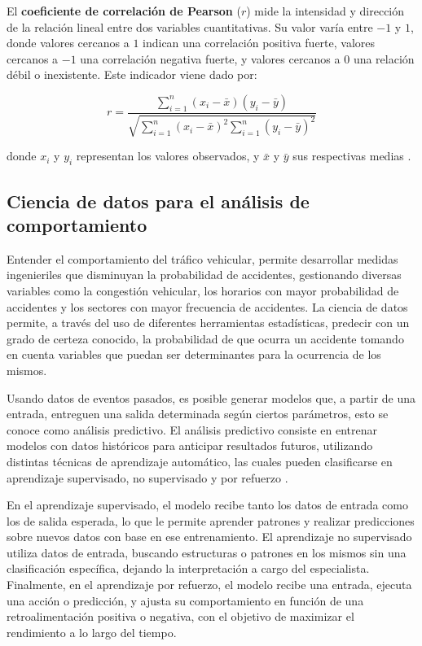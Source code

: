 \documentclass[12pt]{article}
\begin{document}
El \textbf{coeficiente de correlación de Pearson} (\( r \)) mide la intensidad y dirección de la relación lineal entre dos variables cuantitativas. Su valor varía entre $-1$ y $1$, donde valores cercanos a $1$ indican una correlación positiva fuerte, valores cercanos a $-1$ una correlación negativa fuerte, y valores cercanos a $0$ una relación débil o inexistente. Este indicador viene dado por:

\begin{equation}
r = \frac{\sum_{i=1}^{n}(x_i - \bar{x})(y_i - \bar{y})}{\sqrt{\sum_{i=1}^{n}(x_i - \bar{x})^2 \sum_{i=1}^{n}(y_i - \bar{y})^2}}
\end{equation}

donde \( x_i \) y \( y_i \) representan los valores observados, y \( \bar{x} \) y \( \bar{y} \) sus respectivas medias \citep{montgomery2012}.

\subsection{Ciencia de datos para el análisis de comportamiento}

Entender el comportamiento del tráfico vehicular, permite desarrollar medidas ingenieriles que disminuyan la probabilidad de accidentes, gestionando diversas variables como la congestión vehicular, los horarios con mayor probabilidad de accidentes y los sectores con mayor frecuencia de accidentes. La ciencia de datos permite, a través del uso de diferentes herramientas estadísticas, predecir con un grado de certeza conocido, la probabilidad de que ocurra un accidente tomando en cuenta variables que puedan ser determinantes para la ocurrencia de los mismos.

Usando datos de eventos pasados, es posible generar modelos que, a partir de una entrada, entreguen una salida determinada según ciertos parámetros, esto se conoce como análisis predictivo. El análisis predictivo consiste en entrenar modelos con datos históricos para anticipar resultados futuros, utilizando distintas técnicas de aprendizaje automático, las cuales pueden clasificarse en aprendizaje supervisado, no supervisado y por refuerzo \citep{murphy2012machine, geron2019hands, bishop2006pattern}.

En el aprendizaje supervisado, el modelo recibe tanto los datos de entrada como los de salida esperada, lo que le permite aprender patrones y realizar predicciones sobre nuevos datos con base en ese entrenamiento. El aprendizaje no supervisado utiliza datos de entrada, buscando estructuras o patrones en los mismos sin una clasificación específica, dejando la interpretación a cargo del especialista. Finalmente, en el aprendizaje por refuerzo, el modelo recibe una entrada, ejecuta una acción o predicción, y ajusta su comportamiento en función de una retroalimentación positiva o negativa, con el objetivo de maximizar el rendimiento a lo largo del tiempo.
\end{document}
